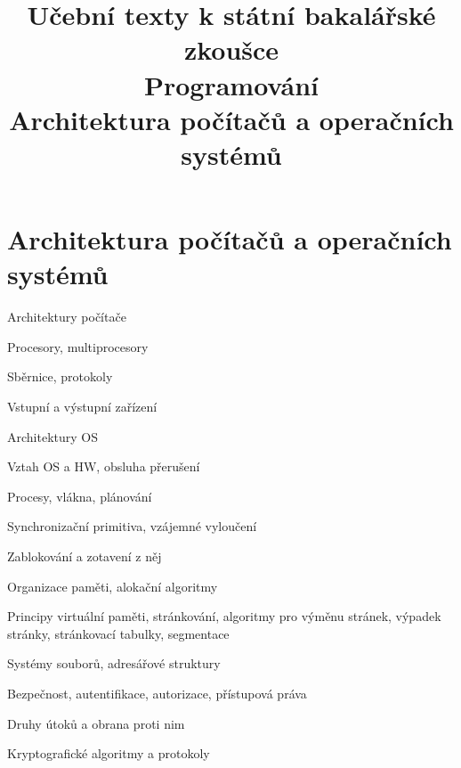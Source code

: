 \clearpage  \clearpage
\title{\LARGE Učební texty k státní bakalářské zkoušce \\ Programování \\ Architektura počítačů a operačních systémů}

\maketitle
\newpage
\setcounter{section}{4}
\section{Architektura počítačů a operačních systémů}
\begin{pozadavky}
\begin{pitemize}
\item Architektury počítače
\item Procesory, multiprocesory
\item Sběrnice, protokoly
\item Vstupní a výstupní zařízení
\item Architektury OS
\item Vztah OS a HW, obsluha přerušení
\item Procesy, vlákna, plánování
\item Synchronizační primitiva, vzájemné vyloučení
\item Zablokování a zotavení z něj
\item Organizace paměti, alokační algoritmy
\item Principy virtuální paměti, stránkování, algoritmy pro výměnu stránek, výpadek stránky, stránkovací tabulky, segmentace
\item Systémy souborů, adresářové struktury
\item Bezpečnost, autentifikace, autorizace, přístupová práva
\item Druhy útoků a obrana proti nim
\item Kryptografické algoritmy a protokoly
\end{pitemize}
\end{pozadavky}






